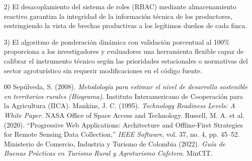 \documentclass[conference]{IEEEtran}
\begin{document}
2) El desacoplamiento del sistema de roles (RBAC) mediante almacenamiento reactivo garantiza la integridad de la información técnica de los productores, restringiendo la vista de brechas productivas a los legítimos dueños de cada finca.

3) El algoritmo de ponderación dinámica con validación porcentual al 100\% proporciona a los investigadores y evaluadores una herramienta flexible capaz de calibrar el instrumento técnico según las prioridades estacionales o normativas del sector agroturístico sin requerir modificaciones en el código fuente.

\begin{thebibliography}{00}
 Sepúlveda, S. (2008). \textit{Metodología para estimar el nivel de desarrollo sostenible en territorios rurales (Biograma)}. Instituto Interamericano de Cooperación para la Agricultura (IICA).
 Mankins, J. C. (1995). \textit{Technology Readiness Levels: A White Paper}. NASA Office of Space Access and Technology.
 Russell, M. A. et al. (2020). ``Progressive Web Applications: Architecture and Offline-First Strategies for Remote Sensing Data Collection,'' \textit{IEEE Software}, vol. 37, no. 4, pp. 45--52.
 Ministerio de Comercio, Industria y Turismo de Colombia (2022). \textit{Guía de Buenas Prácticas en Turismo Rural y Agroturismo Cafetero}. MinCIT.
\end{thebibliography}
\end{document}
